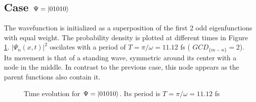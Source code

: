 \documentclass{cis320}
\begin{document}
\subsection{Case $\Psi = \ket{01010}$}

The wavefunction is initialized as a superposition of the first 2 odd eigenfunctions with equal weight. The probability density is plotted at different times in Figure \ref{fig:H01010}. $|\Psi_{n}(x,t)|^2$ oscilates with a period of $T=\pi/\omega=11.12$ fs ( $GCD_{\{m-n\}}=2$).  Its movement is that of a standing wave, symmetric around its center with a node in the middle. In contrast to the previous case, this node appears as the parent functions also contain it.
\begin{figure}[h!]
    \centering
    \caption{Time evolution for $\Psi = \ket{01010}$. Its period is $T=\pi/\omega=11.12$ fs}
    \label{fig:H01010}
\end{figure}
\end{document}
